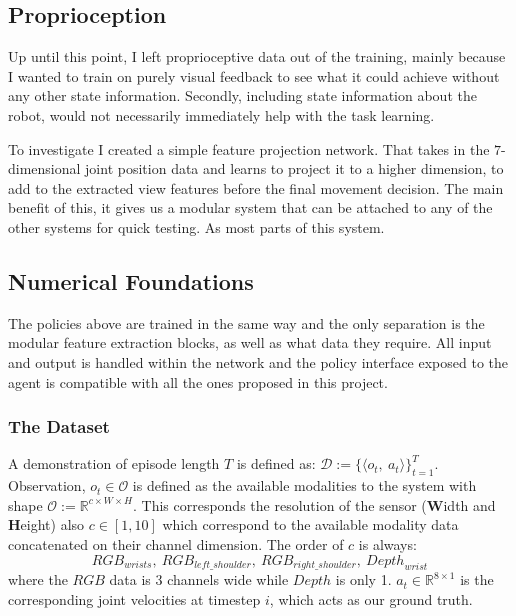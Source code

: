 


\subsection{Proprioception}
Up until this point, I left proprioceptive data out of the training, mainly because I wanted to train on purely visual feedback to see what it could achieve without any other state information. Secondly, including state information about the robot, would not necessarily immediately help with the task learning. 

To investigate I created a simple feature projection network. That takes in the $7$-dimensional joint position data and learns to project it to a higher dimension, to add to the extracted view features before the final movement decision. The main benefit of this, it gives us a modular system that can be attached to any of the other systems for quick testing. As most parts of this system.

\subsection{Numerical Foundations}

The policies above are trained in the same way and the only separation is the modular feature extraction blocks, as well as what data they require. All input and output is handled within the network and the policy interface exposed to the agent is compatible with all the ones proposed in this project.

\subsubsection{The Dataset}
A demonstration of episode length $T$ is defined as: \(\mathcal{D} := \{\langle o_t, ~a_t\rangle\}_{t = 1}^{T} \). Observation, \(o_t \in \mathcal{O}\) is defined as the available modalities to the system with shape \(\mathcal{O} := \mathbb{R}^{c \times W \times H}\). This corresponds the resolution of the sensor (\textbf{W}idth and \textbf{H}eight) also $c \in \left[1, 10\right]$ which correspond to the available modality data concatenated on their channel dimension. The order of $c$ is always:
\[
{RGB}_{wrists}, ~{RGB}_{{left}\_{shoulder}}, ~{RGB}_{{right}\_{shoulder}}, ~{Depth}_{wrist}
\] 
where the $RGB$ data is $3$ channels wide while $Depth$ is only 1. \(a_t \in \mathbb{R}^{8 \times 1}\) is the corresponding joint velocities at timestep $i$, which acts as our ground truth. 

